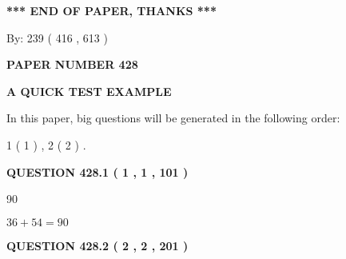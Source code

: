 \documentclass[12pt]{article}
\begin{document}
   
   
   
   
\vspace{1.0in} 
{\textbf{\large{ *** END OF PAPER, THANKS *** }}} 
   
   
\hspace{1.0in} By: 
 239 ( 416 ,  613 )
   
   
   
   
\newpage 
\setcounter{page}{ 
   428001 } 
   
   
   
   
 {\textbf{ \Large{ PAPER NUMBER  428  }}}
   
   
\vspace{0.2in}
   
   
   
   
   
   
 \vspace{0.2in}
{\LARGE {\textbf{ A QUICK TEST EXAMPLE}}}
   
   
   
\vspace{0.2in}
   
In this paper, big questions will be generated in the following order: 
   
   
   1 ( 1 )
 ,
   2 ( 2 )
 .
  
\vspace{0.2in}
  
{\textbf{\Large{QUESTION
428.1 
 ( 1 , 1 , 101 )
}}}
  
  
 
 
\noindent{}

90
 
 
 
 
\noindent{}

$ %
36 +  %
54=   %
90$
 
 
  
\vspace{0.2in}
  
{\textbf{\Large{QUESTION
428.2 
 ( 2 , 2 , 201 )
}}}
  
  
 
 
\noindent{}
 
\end{document}
